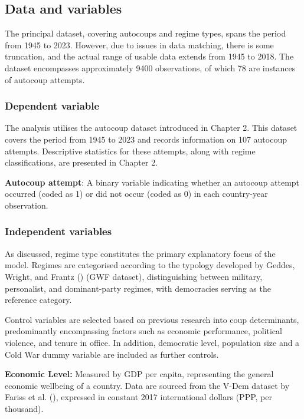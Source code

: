 \documentclass[
  12pt,
]{report}
\begin{document}
\subsection*{Data and variables}\label{data-and-variables}

The principal dataset, covering autocoups and regime types, spans the
period from 1945 to 2023. However, due to issues in data matching, there
is some truncation, and the actual range of usable data extends from
1945 to 2018. The dataset encompasses approximately 9400 observations,
of which 78 are instances of autocoup attempts.

\subsubsection*{Dependent variable}\label{dependent-variable}

The analysis utilises the autocoup dataset introduced in Chapter 2. This
dataset covers the period from 1945 to 2023 and records information on
107 autocoup attempts. Descriptive statistics for these attempts, along
with regime classifications, are presented in Chapter 2.

\textbf{Autocoup attempt}: A binary variable indicating whether an
autocoup attempt occurred (coded as 1) or did not occur (coded as 0) in
each country-year observation.

\subsubsection*{Independent variables}\label{independent-variables}

As discussed, regime type constitutes the primary explanatory focus of
the model. Regimes are categorised according to the typology developed
by Geddes, Wright, and Frantz () (GWF
dataset), distinguishing between military, personalist, and
dominant-party regimes, with democracies serving as the reference
category.

Control variables are selected based on previous research into coup
determinants, predominantly encompassing factors such as economic
performance, political violence, and tenure in office. In addition,
democratic level, population size and a Cold War dummy variable are
included as further controls.

\textbf{Economic Level:} Measured by GDP per capita, representing the
general economic wellbeing of a country. Data are sourced from the V-Dem
dataset by Fariss et al. (), expressed in
constant 2017 international dollars (PPP, per thousand).
\end{document}
